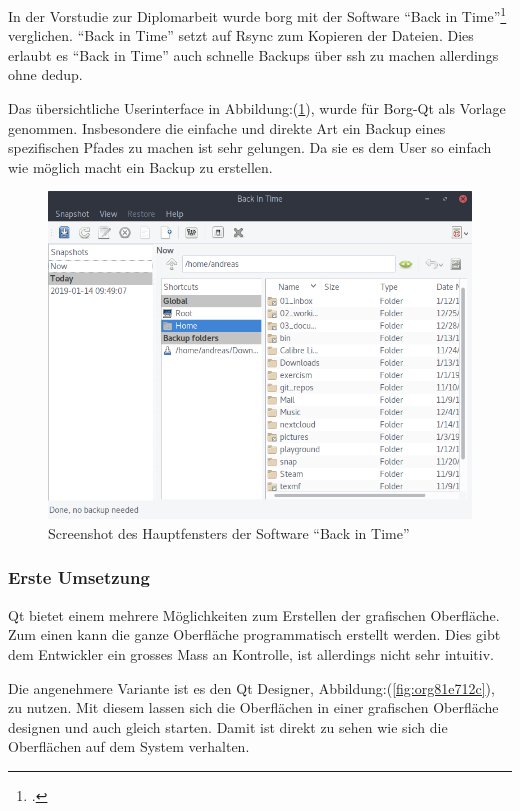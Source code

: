 In der Vorstudie zur Diplomarbeit wurde \gls{borg} mit der Software "`Back in
Time"'\footcite{backintime} verglichen. "`Back in Time"' setzt auf Rsync zum
Kopieren der Dateien. Dies erlaubt es "`Back in Time"' auch schnelle Backups über
\gls{ssh} zu machen allerdings ohne \gls{dedup}.

Das übersichtliche Userinterface in Abbildung:(\ref{fig:org4e63253}), wurde für Borg-Qt
als Vorlage genommen. Insbesondere die einfache und direkte Art ein Backup
eines spezifischen Pfades zu machen ist sehr gelungen. Da sie es dem User so
einfach wie möglich macht ein Backup zu erstellen.

\begin{figure}[htbp]
\centering
\includegraphics[width=.9\linewidth]{pictures/bit_main.png}
\caption{\label{fig:org4e63253}
Screenshot des Hauptfensters der Software "`Back in Time"'}
\end{figure}

\subsubsection{Erste Umsetzung}
\label{sec:org040cd93}

Qt bietet einem mehrere Möglichkeiten zum Erstellen der grafischen Oberfläche.
Zum einen kann die ganze Oberfläche programmatisch erstellt werden. Dies gibt
dem Entwickler ein grosses Mass an Kontrolle, ist allerdings nicht sehr
intuitiv.

Die angenehmere Variante ist es den Qt Designer, Abbildung:(\ref{fig:org81e712c}),
zu nutzen. Mit diesem lassen sich die Oberflächen in einer grafischen
Oberfläche designen und auch gleich starten. Damit ist direkt zu sehen wie sich
die Oberflächen auf dem System verhalten.

